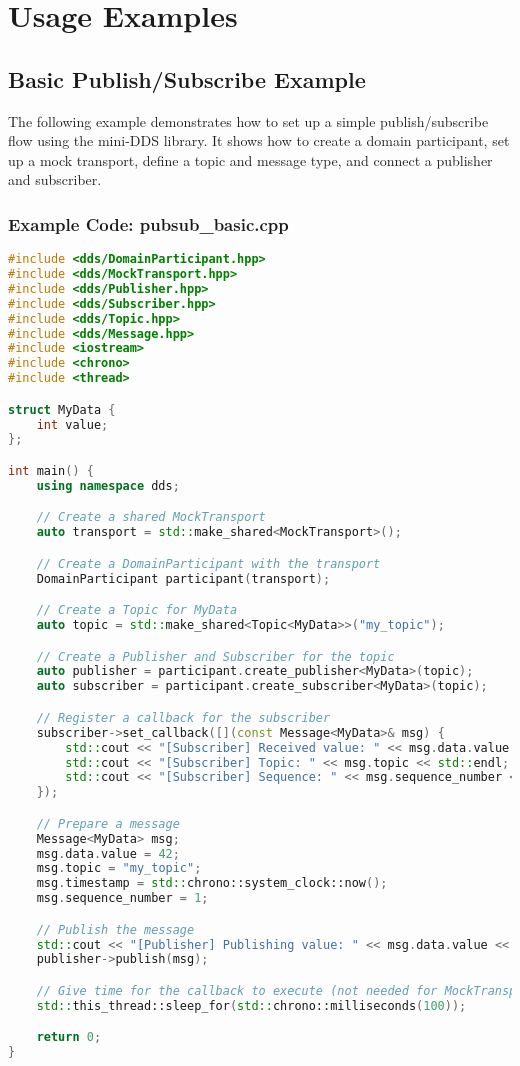 \documentclass[12pt]{report}
\begin{document}
\chapter{Usage Examples}

\section{Basic Publish/Subscribe Example}
The following example demonstrates how to set up a simple publish/subscribe flow using the mini-DDS library. It shows how to create a domain participant, set up a mock transport, define a topic and message type, and connect a publisher and subscriber.

\subsection{Example Code: pubsub\_basic.cpp}
\begin{lstlisting}[language=C++]
#include <dds/DomainParticipant.hpp>
#include <dds/MockTransport.hpp>
#include <dds/Publisher.hpp>
#include <dds/Subscriber.hpp>
#include <dds/Topic.hpp>
#include <dds/Message.hpp>
#include <iostream>
#include <chrono>
#include <thread>

struct MyData {
    int value;
};

int main() {
    using namespace dds;

    // Create a shared MockTransport
    auto transport = std::make_shared<MockTransport>();

    // Create a DomainParticipant with the transport
    DomainParticipant participant(transport);

    // Create a Topic for MyData
    auto topic = std::make_shared<Topic<MyData>>("my_topic");

    // Create a Publisher and Subscriber for the topic
    auto publisher = participant.create_publisher<MyData>(topic);
    auto subscriber = participant.create_subscriber<MyData>(topic);

    // Register a callback for the subscriber
    subscriber->set_callback([](const Message<MyData>& msg) {
        std::cout << "[Subscriber] Received value: " << msg.data.value << std::endl;
        std::cout << "[Subscriber] Topic: " << msg.topic << std::endl;
        std::cout << "[Subscriber] Sequence: " << msg.sequence_number << std::endl;
    });

    // Prepare a message
    Message<MyData> msg;
    msg.data.value = 42;
    msg.topic = "my_topic";
    msg.timestamp = std::chrono::system_clock::now();
    msg.sequence_number = 1;

    // Publish the message
    std::cout << "[Publisher] Publishing value: " << msg.data.value << std::endl;
    publisher->publish(msg);

    // Give time for the callback to execute (not needed for MockTransport, but good practice)
    std::this_thread::sleep_for(std::chrono::milliseconds(100));

    return 0;
}
\end{lstlisting}
\end{document}

